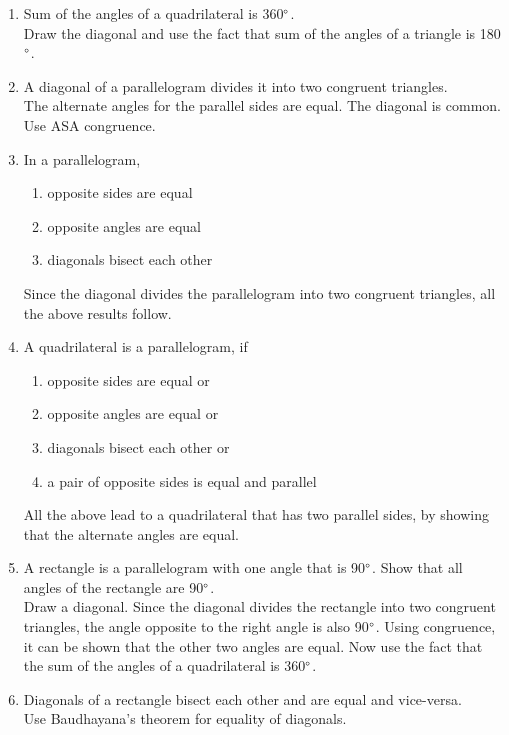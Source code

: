 \renewcommand{\theequation}{\theenumi}
\begin{enumerate}[label=\arabic*.,ref=\thesubsection.\theenumi]
%
\item Sum of the angles of a quadrilateral is 360$\degree$. 
\\
\solution Draw the diagonal and use the fact that sum of the angles of a triangle is 180$\degree$.
\item  A diagonal of a parallelogram divides it into two congruent triangles. 
\\
\solution The alternate angles for the parallel sides are equal.  The diagonal is common.  Use ASA congruence.
%
\item  In a parallelogram, 
\begin{enumerate}
\item opposite sides are equal 
\item  opposite angles are equal
\item  diagonals bisect each other
\end{enumerate}
%
\solution Since the diagonal divides the parallelogram into two congruent triangles, all the above results follow.
%
\item  A quadrilateral is a parallelogram, if 
%
\begin{enumerate}
\item opposite sides are equal or 
\item  opposite angles are equal or 
\item  diagonals bisect each other or 
\item a pair of opposite sides is equal and parallel
\end{enumerate}
%
\solution All the above lead to a quadrilateral that has two parallel sides, by showing that the alternate angles are equal.
%
%
\item A rectangle is a parallelogram with one angle that is 90$\degree$.  Show that all angles of the rectangle are 90$\degree$.
%
\\
\solution Draw a diagonal.  Since the diagonal divides the rectangle into two congruent triangles, the angle opposite to the right angle is also 90$\degree$. Using congruence, it can be shown that the other two angles are equal.  Now use the fact that the sum of the angles of a quadrilateral is 360$\degree$.
%
\item  Diagonals of a rectangle bisect each other and are equal and vice-versa. 
%
\\
\solution Use Baudhayana's theorem for equality of diagonals.

\end{enumerate}
